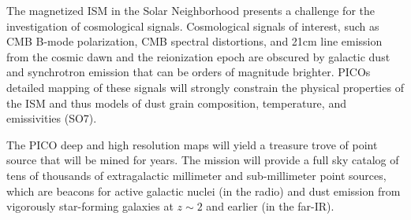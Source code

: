 \documentclass[PICOReport.tex]{subfiles}
\begin{document}
The magnetized ISM in the Solar Neighborhood presents a challenge for the investigation of cosmological signals. Cosmological signals of interest, such as CMB B-mode polarization, CMB spectral distortions, and 21cm line emission from the cosmic dawn and the reionization epoch are obscured by galactic dust and synchrotron emission that can be orders of magnitude brighter. PICOs detailed mapping of these signals will strongly constrain the physical properties of the ISM and thus models of dust grain composition, temperature, and emissivities (SO7). 

The PICO deep and high resolution maps will yield a treasure trove of point source that will be mined for years. The mission will provide a full sky catalog of tens of thousands of extragalactic millimeter and sub-millimeter point sources, which are beacons for active galactic nuclei (in the radio) and dust emission from vigorously star-forming galaxies at $z \sim 2$ and earlier (in the far-IR). 


\end{document}
